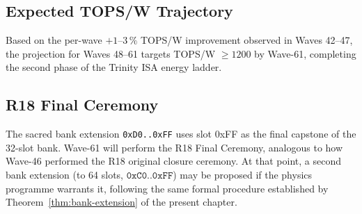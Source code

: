 \subsection{Expected TOPS/W Trajectory}

Based on the per-wave $+1$--$3\,\%$ TOPS/W improvement observed in
Waves 42--47, the projection for Waves 48--61 targets TOPS/W $\geq 1200$
by Wave-61, completing the second phase of the Trinity ISA energy ladder.

\subsection{R18 Final Ceremony}

The sacred bank extension \texttt{0xD0..0xFF} uses slot 0xFF as the final
capstone of the 32-slot bank.
Wave-61 will perform the R18 Final Ceremony, analogous to how Wave-46
performed the R18 original closure ceremony.
At that point, a second bank extension (to 64 slots, $\texttt{0xC0..0xFF}$)
may be proposed if the physics programme warrants it, following the same
formal procedure established by Theorem~\ref{thm:bank-extension} of the
present chapter.


% 


